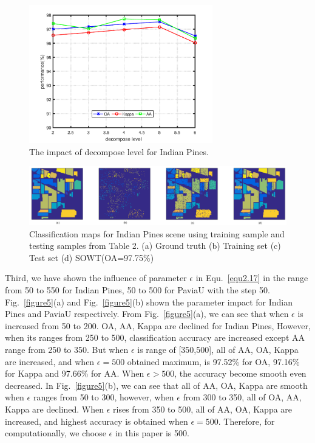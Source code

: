 \documentclass{ws-ijwmip}
\begin{document}
  \begin{figure}[bh]
\centerline{\includegraphics[width=8cm]{image/decomposeLevel}}
\vspace*{8pt}
\caption{The impact of decompose level for Indian Pines.}
\label{figure6}
\end{figure}

\begin{figure}[bh]
\centerline{\includegraphics[width=13cm]{image/indian_map}}
\vspace*{8pt}
\caption{Classification maps for Indian Pines scene using training sample and testing samples from Table 2. (a) Ground truth (b) Training set (c) Test set (d) SOWT(OA=97.75\%)}
\label{figure7}
\end{figure}



Third, we have shown the influence of parameter $\epsilon$ in Equ.~\ref{equ2.17} in the range from 50 to 550 for Indian Pines, 50 to 500 for PaviaU with the step 50. Fig.~\ref{figure5}(a) and Fig.~\ref{figure5}(b) shown the parameter impact for Indian Pines and PaviaU respectively. From Fig.~\ref{figure5}(a), we can see that when $\epsilon$ is increased from 50 to 200. OA, AA, Kappa are declined for Indian Pines, However, when its ranges from 250 to 500, classification accuracy are increased except AA range from 250 to 350. But when $\epsilon$ is range of [350,500], all of AA, OA, Kappa are increased, and when $\epsilon = 500$ obtained maximum, is 97.52\% for OA, 97.16\% for Kappa and 97.66\% for AA. When $\epsilon>500$, the accuracy become smooth even decreased. In Fig.~\ref{figure5}(b), we can see that all of AA, OA, Kappa are smooth when $\epsilon$ ranges from 50 to 300, however, when $\epsilon$ from 300 to 350, all of OA, AA, Kappa are declined. When $\epsilon$ rises from 350 to 500, all of AA, OA, Kappa are increased, and highest accuracy is obtained when $\epsilon =500$. Therefore, for computationally, we choose $\epsilon$ in this paper is 500.
\end{document}
